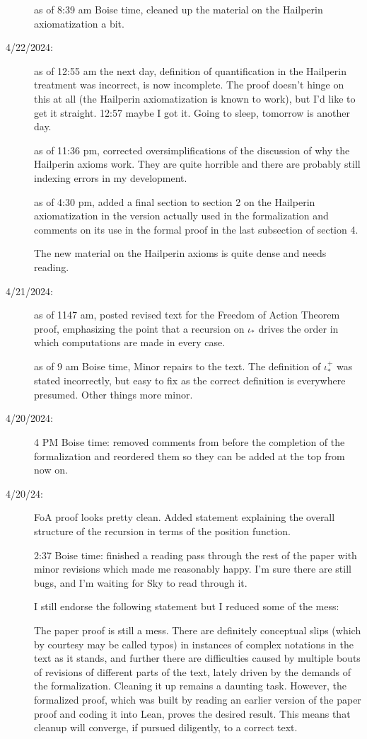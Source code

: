 \documentclass[112pt]{article}
\begin{document}
\begin{description}
as of 8:39 am Boise time, cleaned up the material on the Hailperin axiomatization a bit.

\item[4/22/2024:]  

as of 12:55 am the next day, definition of quantification in the Hailperin treatment was incorrect, is now incomplete.  The proof doesn't hinge on this at all (the Hailperin axiomatization is known to work), but I'd like to get it straight.  12:57 maybe I got it.  Going to sleep, tomorrow is another day.

as of 11:36 pm, corrected oversimplifications of the discussion of why the Hailperin axioms work.  They are quite horrible and there are probably still indexing errors in my development.

as of 4:30 pm, added a final section to section 2 on the Hailperin axiomatization in the version actually used in the formalization and comments on its use in the formal proof in the last subsection of section 4.

The new material on the Hailperin axioms is quite dense and needs reading.

\item[4/21/2024:]  as of 1147 am, posted revised text for the Freedom of Action Theorem proof, emphasizing the point that a recursion on $\iota_*$ drives the order in which computations are made in every case.

as of 9 am Boise time, Minor repairs to the text.  The definition of $\iota_*^+$ was stated incorrectly, but easy to fix as the correct definition is everywhere presumed.  Other things more minor.

\item[4/20/2024:] 4 PM Boise time:  removed comments from before the completion of the formalization and reordered them so they can be added at the top from now on.

\item[4/20/24:]  FoA proof looks pretty clean.  Added statement explaining the overall structure of the recursion in terms of the position function.

2:37 Boise time:  finished a reading pass through the rest of the paper with minor revisions which made me reasonably happy.  I'm sure there are still bugs, and I'm waiting for Sky to read through it.

I still endorse the following statement but I reduced some of the mess:

The paper proof is still a mess.  There are definitely conceptual slips (which by courtesy may be called typos) in instances of complex notations in the text as it stands, and further there are difficulties caused by multiple bouts of revisions of different parts of the text, lately driven by the demands of the formalization.
Cleaning it up remains a daunting task.  However, the formalized proof, which was built by reading an earlier version of the paper proof and coding it into Lean, proves the desired result.  This means that cleanup will converge, if pursued diligently, to a correct text.


\end{description}
\end{document}
